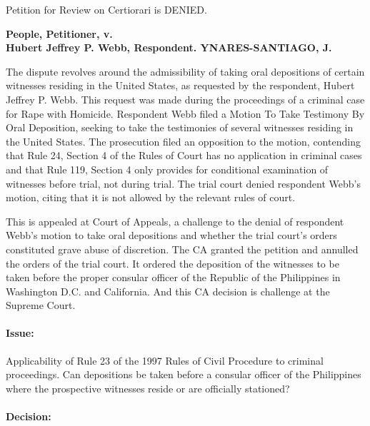 \documentclass[
12pt,
oneside,
onehalfspacing,
headsepline
]{DigestCollection}
\begin{document}
Petition for Review on Certiorari is DENIED.

\label{18d7e010-0a10-11ef-932c-63c852f65e48}


\noindent\textbf{People, Petitioner, v. \\Hubert Jeffrey P. Webb, Respondent. YNARES-SANTIAGO, J.}\vspace{0.4cm}

The dispute revolves around the admissibility of taking oral depositions of certain witnesses residing in the United States, as requested by the respondent, Hubert Jeffrey P. Webb. This request was made during the proceedings of a criminal case for Rape with Homicide. Respondent Webb filed a Motion To Take Testimony By Oral Deposition, seeking to take the testimonies of several witnesses residing in the United States. The prosecution filed an opposition to the motion, contending that Rule 24, Section 4 of the Rules of Court has no application in criminal cases and that Rule 119, Section 4 only provides for conditional examination of witnesses before trial, not during trial. The trial court denied respondent Webb's motion, citing that it is not allowed by the relevant rules of court.

This is appealed at Court of Appeals, a challenge to the denial of respondent Webb's motion to take oral depositions and whether the trial court's orders constituted grave abuse of discretion. The CA granted the petition and annulled the orders of the trial court. It ordered the deposition of the witnesses to be taken before the proper consular officer of the Republic of the Philippines in Washington D.C. and California. And this CA decision is challenge at the Supreme Court.

\paragraph{Issue:}
\label{f62b8d80-09fd-11ef-932c-63c852f65e48}


Applicability of Rule 23 of the 1997 Rules of Civil Procedure to criminal proceedings. Can depositions be taken before a consular officer of the Philippines where the prospective witnesses reside or are officially stationed?

\paragraph{Decision:}
\label{f7bcdbe0-09fd-11ef-932c-63c852f65e48}
\end{document}

